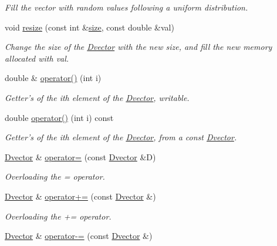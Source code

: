 \begin{DoxyCompactItemize}
\begin{DoxyCompactList}\small\item\em Fill the vector with random values following a uniform distribution. \end{DoxyCompactList}\item 
void \hyperlink{classDvector_ae5708b29ce6c3d989e6d05f5dbfcb2b0}{resize} (const int \&\hyperlink{classDvector_af92b914997c31751ca7f805f63e0d543}{size}, const double \&val)
\begin{DoxyCompactList}\small\item\em Change the size of the \hyperlink{classDvector}{Dvector} with the new size, and fill the new memory allocated with val. \end{DoxyCompactList}\item 
double \& \hyperlink{classDvector_ae355bf2da1777227c39e5687810c1b41}{operator()} (int i)
\begin{DoxyCompactList}\small\item\em Getter's of the ith element of the \hyperlink{classDvector}{Dvector}, writable. \end{DoxyCompactList}\item 
double \hyperlink{classDvector_ab36d783942e527645ae497ff7fe2e038}{operator()} (int i) const 
\begin{DoxyCompactList}\small\item\em Getter's of the ith element of the \hyperlink{classDvector}{Dvector}, from a const \hyperlink{classDvector}{Dvector}. \end{DoxyCompactList}\item 
\hyperlink{classDvector}{Dvector} \& \hyperlink{classDvector_a12f34e49012dd55b605eadfb41ea8ec0}{operator=} (const \hyperlink{classDvector}{Dvector} \&D)
\begin{DoxyCompactList}\small\item\em Overloading the = operator. \end{DoxyCompactList}\item 
\hyperlink{classDvector}{Dvector} \& \hyperlink{classDvector_af8792a4ca9c76251e5e6de5b7c73306f}{operator+=} (const \hyperlink{classDvector}{Dvector} \&)
\begin{DoxyCompactList}\small\item\em Overloading the += operator. \end{DoxyCompactList}\item 
\hyperlink{classDvector}{Dvector} \& \hyperlink{classDvector_a596872218e11d528f9f158b45027225a}{operator-\/=} (const \hyperlink{classDvector}{Dvector} \&)

\end{DoxyCompactItemize}
